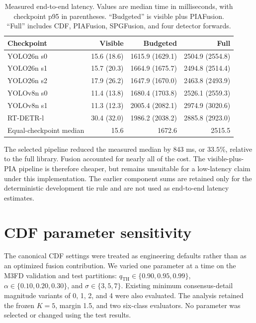 \documentclass[11pt]{article}
\begin{document}
\begin{table}[ht]
\centering
\small
\setlength{\tabcolsep}{3pt}
\caption{Measured end-to-end latency. Values are median time in milliseconds,
with checkpoint p95 in parentheses. ``Budgeted'' is visible plus PIAFusion.
``Full'' includes CDF, PIAFusion, SPGFusion, and four detector forwards.}
\label{tab:pia-latency}
\begin{tabular}{@{}lrrr@{}}
\toprule
Checkpoint & Visible & Budgeted & Full \\
\midrule
YOLO26n s0 & 15.6 (18.6) & 1615.9 (1629.1) & 2504.9 (2554.8) \\
YOLO26n s1 & 15.7 (20.3) & 1664.9 (1675.7) & 2494.8 (2514.4) \\
YOLO26n s2 & 17.9 (26.2) & 1647.9 (1670.0) & 2463.8 (2493.9) \\
YOLOv8n s0 & 11.4 (13.8) & 1680.4 (1703.8) & 2526.1 (2559.3) \\
YOLOv8n s1 & 11.3 (12.3) & 2005.4 (2082.1) & 2974.9 (3020.6) \\
RT-DETR-l & 30.4 (32.0) & 1986.2 (2038.2) & 2885.8 (2923.0) \\
\midrule
Equal-checkpoint median & 15.6 & 1672.6 & 2515.5 \\
\bottomrule
\end{tabular}
\end{table}

The selected pipeline reduced the measured median by 843 ms, or \(33.5\%\),
relative to the full library. Fusion accounted for nearly all of the cost.
The visible-plus-PIA pipeline is therefore cheaper, but remains unsuitable
for a low-latency claim under this implementation. The earlier component sums
are retained only for the deterministic development tie rule and are not used
as end-to-end latency estimates.

\section{CDF parameter sensitivity}

The canonical CDF settings were treated as engineering defaults rather than
as an optimized fusion contribution. We varied one parameter at a time on the
M3FD validation and test partitions: \(q_{\mathrm{TH}}\in\{0.90,0.95,0.99\}\),
\(\alpha\in\{0.10,0.20,0.30\}\), and
\(\sigma\in\{3,5,7\}\). Existing minimum consensus-detail magnitude variants
of 0, 1, 2, and 4 were also evaluated. The analysis retained the frozen
\(K=5\), margin 1.5, and two six-class evaluators. No parameter was selected
or changed using the test results.
\end{document}
